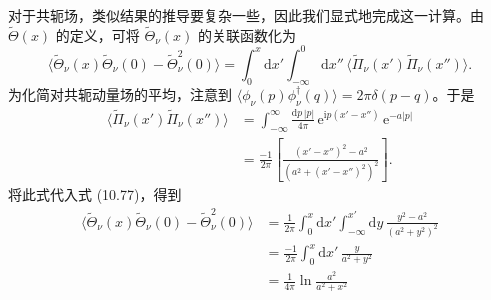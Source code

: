 对于共轭场，类似结果的推导要复杂一些，因此我们显式地完成这一计算。由 $\tilde{\Theta}(x)$ 的定义，可将 $\tilde{\Theta}_{\nu}(x)$ 的关联函数化为
\begin{equation*}
\langle\tilde{\Theta}_{\nu}(x)\tilde{\Theta}_{\nu}(0)-\tilde{\Theta}_{\nu}^{2}(0)\rangle=\int_{0}^{x}\mathrm{d}x'\int_{-\infty}^{0}\mathrm{d}x''\,\langle\tilde{\Pi}_{\nu}(x')\tilde{\Pi}_{\nu}(x'')\rangle.
\tag{10.77}
\end{equation*}
为化简对共轭动量场的平均，注意到 $\langle\phi_{\nu}(p)\phi_{\nu}^{\dagger}(q)\rangle=2\pi\delta(p-q)$。于是
\begin{align*}
\langle\tilde{\Pi}_{\nu}(x')\tilde{\Pi}_{\nu}(x'')\rangle&=\int_{-\infty}^{\infty}\frac{\mathrm{d}p\,|p|}{4\pi}\,\mathrm{e}^{\mathrm{i}p(x'-x'')}\,\mathrm{e}^{-a|p|}\\
&=\frac{-1}{2\pi}\left[\frac{(x'-x'')^{2}-a^{2}}{\left(a^{2}+(x'-x'')^{2}\right)^{2}}\right].
\tag{10.78}
\end{align*}
将此式代入式 (10.77)，得到
\begin{align*}
\langle\tilde{\Theta}_{\nu}(x)\tilde{\Theta}_{\nu}(0)-\tilde{\Theta}_{\nu}^{2}(0)\rangle&=\frac{1}{2\pi}\int_{0}^{x}\mathrm{d}x'\int_{-\infty}^{x'}\mathrm{d}y\,\frac{y^{2}-a^{2}}{(a^{2}+y^{2})^{2}}\\
&=\frac{-1}{2\pi}\int_{0}^{x}\mathrm{d}x'\,\frac{y}{a^{2}+y^{2}}\\
&=\frac{1}{4\pi}\ln\frac{a^{2}}{a^{2}+x^{2}}
\tag{10.79}
\end{align*}

